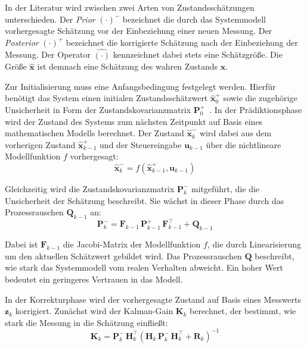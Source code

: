In der Literatur wird zwischen zwei Arten von Zustandsschätzungen unterschieden.
Der \textit{Prior} $(\cdot)^{-}$ bezeichnet die durch das Systemmodell vorhergesagte Schätzung vor der Einbeziehung einer neuen Messung. 
Der \textit{Posterior} $(\cdot)^{+}$ bezeichnet die korrigierte Schätzung nach der Einbeziehung der Messung.
Der Operator $\hat{(\cdot)}$ kennzeichnet dabei stets eine Schätzgröße.
Die Größe $\hat{\mathbf{x}}$ ist demnach eine Schätzung des wahren Zustands $\mathbf{x}$.~\cite{Bang18}

Zur Initialisierung muss eine Anfangsbedingung festgelegt werden.
Hierfür benötigt das System einen initialen Zustandsschätzwert $\hat{\mathbf{x}}_0^{+}$ sowie die zugehörige Unsicherheit in Form der 
Zustandskovarianzmatrix $\mathbf{P}_0^{+}$~\cite{Bang18}.
In der Prädiktionsphase wird der Zustand des Systems zum nächsten Zeitpunkt auf Basis eines mathematischen Modells berechnet.
Der Zustand $\hat{\mathbf{x}}_k^{-}$ wird dabei aus dem vorherigen Zustand $\hat{\mathbf{x}}_{k-1}^{+}$ und der Steuereingabe 
$\mathbf{u}_{k-1}$ über die nichtlineare Modellfunktion $f$ vorhergesagt:
\begin{equation}
    \hat{\mathbf{x}}_k^{-} = f\left(\hat{\mathbf{x}}_{k-1}^{+}, \mathbf{u}_{k-1}\right)
\end{equation}

Gleichzeitig wird die Zustandskovarianzmatrix $\mathbf{P}_k^{-}$ mitgeführt, die die Unsicherheit der Schätzung beschreibt.
Sie wächst in dieser Phase durch das Prozessrauschen $\mathbf{Q}_{k-1}$ an:
\begin{equation}
    \mathbf{P}_k^{-} = \mathbf{F}_{k-1}\,\mathbf{P}_{k-1}^{+}\,\mathbf{F}_{k-1}^{\top} + \mathbf{Q}_{k-1}
\end{equation}

Dabei ist $\mathbf{F}_{k-1}$ die Jacobi-Matrix der Modellfunktion $f$, die durch Linearisierung um den aktuellen Schätzwert gebildet wird.
Das Prozessrauschen $\mathbf{Q}$ beschreibt, wie stark das Systemmodell vom realen Verhalten abweicht.
Ein hoher Wert bedeutet ein geringeres Vertrauen in das Modell.

In der Korrekturphase wird der vorhergesagte Zustand auf Basis eines Messwerts $\mathbf{z}_k$ korrigiert.
Zunächst wird der Kalman-Gain $\mathbf{K}_k$ berechnet, der bestimmt, wie stark die Messung in die Schätzung einfließt:
\begin{equation}
    \mathbf{K}_k = \mathbf{P}_k^{-}\,\mathbf{H}_k^{\top}\left(\mathbf{H}_k\,\mathbf{P}_k^{-}\,\mathbf{H}_k^{\top} + \mathbf{R}_k\right)^{-1}
\end{equation}

